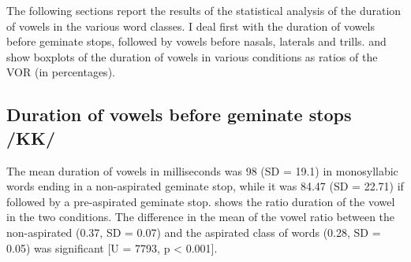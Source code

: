\documentclass[11pt,a4paper,openany]{memoir}\usepackage[]{graphicx}\usepackage[]{color}
\begin{document}
The following sections report the results of the statistical analysis of the duration of vowels in the various word classes.
I deal first with the duration of vowels before geminate stops, followed by vowels before nasals, laterals and trills.
 and  show boxplots of the duration of vowels in various conditions as ratios of the VOR (in percentages).

\subsection{Duration of vowels before geminate stops /KK/}


The mean duration of vowels in milliseconds was 98 (SD = 19.1) in monosyllabic words ending in a non-aspirated geminate stop, while it was 84.47 (SD = 22.71) if followed by a pre-aspirated geminate stop.
 shows the ratio duration of the vowel in the two conditions.
The difference in the mean of the vowel ratio between the non-aspirated (0.37, SD = 0.07) and the aspirated class of words (0.28, SD = 0.05) was significant [U = 7793, p < 0.001].
\end{document}

